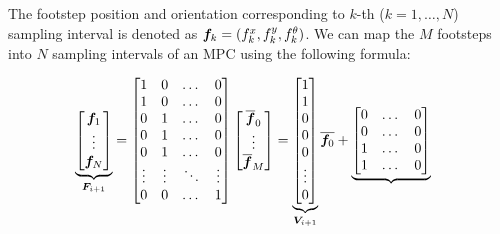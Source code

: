 \documentclass[a4paper]{article}
\begin{document}
\noindent The footstep position and orientation corresponding to $k$-th ($k = 1,\dots,N$) sampling interval is denoted as $\V{f}_k = (f^x_k, f^y_k, f^{\theta}_k)$.
We can map the $M$ footsteps into $N$ sampling intervals of an MPC using the following formula:

\begin{equation}
\begin{split}
    \underbrace{
    \begin{bmatrix} 
        \M{f}_1 \\ 
        \vdots \\ 
        \M{f}_N 
    \end{bmatrix}
    }_{\M{F}_{i+1}}
    & = 
    \begin{bmatrix}
        1   &  0   &   \dots   &   0 \\
        1   &  0   &   \dots   &   0 \\
        0   &  1   &   \dots   &   0 \\
        0   &  1   &   \dots   &   0 \\
        0   &  1   &   \dots   &   0 \\
        \vdots  &  \vdots  &   \ddots  &   \vdots \\
        0   &  0   &   \dots   &   1 \\
    \end{bmatrix}
    \begin{bmatrix}
        \overline{\M{f}}_0\\
        \vdots\\
        \overline{\M{f}}_M \\
    \end{bmatrix}
    =
    \underbrace{
    \begin{bmatrix}
        1   \\
        1   \\
        0   \\
        0   \\
        0   \\
        \vdots  \\
        0   \\
    \end{bmatrix}}_{\M{V}_{i+1}}
    \overline{\M{f}_0}
    +
    \underbrace{
    \begin{bmatrix}
        0   &   \dots   &   0 \\
        0   &   \dots   &   0 \\
        1   &   \dots   &   0 \\
        1   &   \dots   &   0 \\

\end{bmatrix}}
\end{split}
\end{equation}
\end{document}
